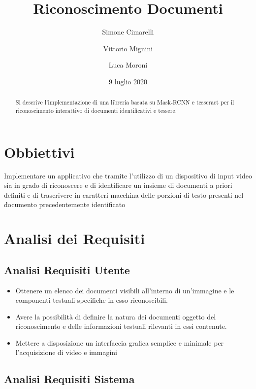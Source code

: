\documentclass[12pt,a4paper]{article}
\begin{document}
\title{Riconoscimento Documenti}
\author{Simone Cimarelli \and Vittorio Mignini \and Luca Moroni}
\date{9 luglio 2020}

\maketitle

\begin{abstract}
    Si descrive l'implementazione di una libreria basata su Mask-RCNN e
    tesseract per il riconoscimento interattivo di documenti
    identificativi e tessere.
\end{abstract}

\section{Obbiettivi}

Implementare un applicativo che tramite l'utilizzo di un dispositivo di input video sia in
grado di riconoscere e di identificare un insieme di documenti a priori definiti
e di trascrivere in caratteri macchina delle porzioni di testo presenti nel documento precedentemente identificato

\section{Analisi dei Requisiti}
\subsection{Analisi Requisiti Utente}

\begin{itemize}
    \item Ottenere un elenco dei documenti visibili all'interno di
        un'immagine e le componenti testuali specifiche in esso
        riconoscibili.
    \item Avere la possibilità di definire la natura dei documenti
        oggetto del riconoscimento e delle informazioni testuali
        rilevanti in essi contenute.
    \item Mettere a disposizione un interfaccia grafica semplice e minimale per l'acquisizione di video e immagini

\end{itemize}

\subsection{Analisi Requisiti Sistema}
\end{document}
